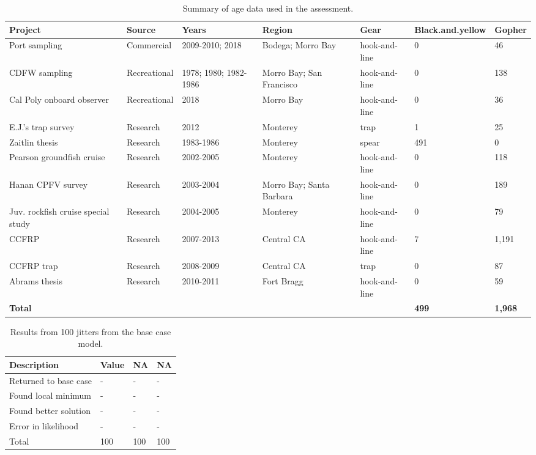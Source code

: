 \documentclass[12pt,]{article}
\begin{document}
\FloatBarrier

\begin{table}
\centering
\caption{Summary of age data used in the assessment.} 
\label{tab:Age_data}
\begin{tabular}{>{\raggedright}p{1.6in}l>{\raggedright}p{1.3in}>{\raggedright}p{1.3in}>{\raggedright}p{1in}>{\raggedright}p{1in}>{\raggedright}p{1in}}
  \hline
Project & Source & Years & Region & Gear & Black.and.yellow & Gopher \\ 
  \hline
Port sampling & Commercial & 2009-2010; 2018 & Bodega; Morro Bay & hook-and-line & 0 & 46 \\ 
  CDFW sampling & Recreational & 1978; 1980; 1982-1986 & Morro Bay; San Francisco & hook-and-line & 0 & 138 \\ 
  Cal Poly onboard observer & Recreational & 2018 & Morro Bay & hook-and-line & 0 & 36 \\ 
  E.J.'s trap survey & Research & 2012 & Monterey & trap & 1 & 25 \\ 
  Zaitlin thesis & Research & 1983-1986 & Monterey & spear & 491 & 0 \\ 
  Pearson groundfish cruise & Research & 2002-2005 & Monterey & hook-and-line & 0 & 118 \\ 
  Hanan CPFV survey & Research & 2003-2004 & Morro Bay; Santa Barbara & hook-and-line & 0 & 189 \\ 
  Juv. rockfish cruise special study & Research & 2004-2005 & Monterey & hook-and-line & 0 & 79 \\ 
  CCFRP & Research & 2007-2013 & Central CA & hook-and-line & 7 & 1,191 \\ 
  CCFRP trap & Research & 2008-2009 & Central CA & trap & 0 & 87 \\ 
  Abrams thesis & Research & 2010-2011 & Fort Bragg & hook-and-line & 0 & 59 \\ 
  \textbf{Total} &  &  &  &  & \textbf{499} & \textbf{1,968} \\ 
   \hline
\end{tabular}
\end{table}

\FloatBarrier

\begin{table}[ht]
\centering
\caption{Results from 100 jitters from the base 
                                      case model.} 
\label{tab:jitter}
\begin{tabular}{llll}
  \hline
Description & Value & NA & NA \\ 
  \hline
Returned to base case & - & - & - \\ 
  Found local minimum & - & - & - \\ 
  Found better solution & - & - & - \\ 
  Error in likelihood & - & - & - \\ 
  Total & 100 & 100 & 100 \\ 
   \hline
\end{tabular}
\end{table}
\end{document}
